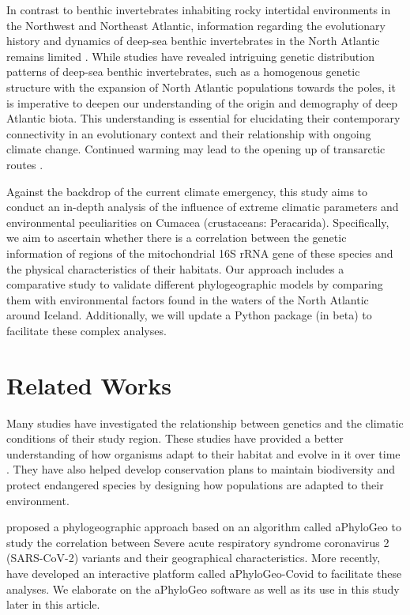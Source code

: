 In contrast to benthic invertebrates inhabiting rocky intertidal environments in the Northwest and Northeast Atlantic, information regarding the evolutionary history and dynamics of deep-sea benthic invertebrates in the North Atlantic remains limited \citep{jennings_phylogeographic_2014}. While studies have revealed intriguing genetic distribution patterns of deep-sea benthic invertebrates, such as a homogenous genetic structure with the expansion of North Atlantic populations towards the poles, it is imperative to deepen our understanding of the origin and demography of deep Atlantic biota. This understanding is essential for elucidating their contemporary connectivity in an evolutionary context and their relationship with ongoing climate change. Continued warming may lead to the opening up of transarctic routes \citep{jennings_phylogeographic_2014}.

Against the backdrop of the current climate emergency, this study aims to conduct an in-depth analysis of the influence of extreme climatic parameters and environmental peculiarities on Cumacea (crustaceans: Peracarida). Specifically, we aim to ascertain whether there is a correlation between the genetic information of regions of the mitochondrial 16S rRNA gene of these species and the physical characteristics of their habitats. Our approach includes a comparative study to validate different phylogeographic models by comparing them with environmental factors found in the waters of the North Atlantic around Iceland. Additionally, we will update a Python package (in beta) to facilitate these complex analyses.

\section{Related Works}\label{related-works}
Many studies have investigated the relationship between genetics and the climatic conditions of their study region. These studies have provided a better understanding of how organisms adapt to their habitat and evolve in it over time \citep{fc_genomic_2012}. They have also helped develop conservation plans to maintain biodiversity and protect endangered species by designing how populations are adapted to their environment.

\cite{koshkarov_phylogeography_2022} proposed a phylogeographic approach based on an algorithm called aPhyloGeo to study the correlation between Severe acute respiratory syndrome coronavirus 2 (SARS-CoV-2) variants and their geographical characteristics. More recently, \cite{li_aphylogeo-covid_2023} have developed an interactive platform called aPhyloGeo-Covid to facilitate these analyses.  We elaborate on the aPhyloGeo software as well as its use in this study later in this article.

